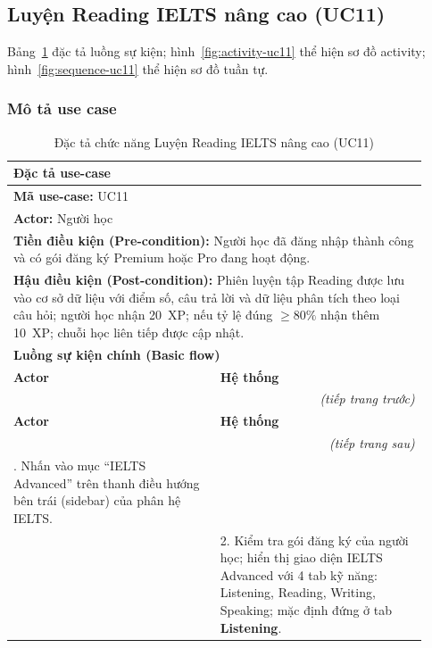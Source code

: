 \subsection{Luyện Reading IELTS nâng cao (UC11)}
Bảng~\ref{tab:uc11_spec} đặc tả luồng sự kiện; hình~\ref{fig:activity-uc11} thể hiện sơ đồ activity; hình~\ref{fig:sequence-uc11} thể hiện sơ đồ tuần tự.
\subsubsection{Mô tả use case}
\renewcommand{\arraystretch}{1.3}
\begin{longtable}{|p{0.46\linewidth}|p{0.46\linewidth}|}
    \caption{Đặc tả chức năng Luyện Reading IELTS nâng cao (UC11)} \label{tab:uc11_spec} \\
    \hline
    \multicolumn{2}{|l|}{\textbf{Đặc tả use-case}} \\ \hline
    \multicolumn{2}{|l|}{\textbf{Mã use-case:} UC11} \\ \hline
    \multicolumn{2}{|l|}{\textbf{Actor:} Người học} \\ \hline
    \multicolumn{2}{|p{0.88\linewidth}|}{\textbf{Tiền điều kiện (Pre-condition):} Người học đã đăng nhập thành công và có gói đăng ký Premium hoặc Pro đang hoạt động.} \\ \hline
    \multicolumn{2}{|p{0.88\linewidth}|}{\textbf{Hậu điều kiện (Post-condition):} Phiên luyện tập Reading được lưu vào cơ sở dữ liệu với điểm số, câu trả lời và dữ liệu phân tích theo loại câu hỏi; người học nhận 20~XP; nếu tỷ lệ đúng $\geq 80\%$ nhận thêm 10~XP; chuỗi học liên tiếp được cập nhật.} \\ \hline
    \multicolumn{2}{|l|}{\textbf{Luồng sự kiện chính (Basic flow)}} \\ \hline
    \textbf{Actor} & \textbf{Hệ thống} \\ \hline
    \endfirsthead
    \multicolumn{2}{r}{\textit{(tiếp trang trước)}} \\
    \hline
    \textbf{Actor} & \textbf{Hệ thống} \\ \hline
    \endhead
    \hline
    \multicolumn{2}{r}{\textit{(tiếp trang sau)}} \\
    \endfoot
    \hline
    \endlastfoot
    1. Nhấn vào mục ``IELTS Advanced'' trên thanh điều hướng bên trái (sidebar) của phân hệ IELTS. & \\ \hline
    & 2. Kiểm tra gói đăng ký của người học; hiển thị giao diện IELTS Advanced với 4 tab kỹ năng: Listening, Reading, Writing, Speaking; mặc định đứng ở tab \textbf{Listening}. \\ \hline

\end{longtable}
